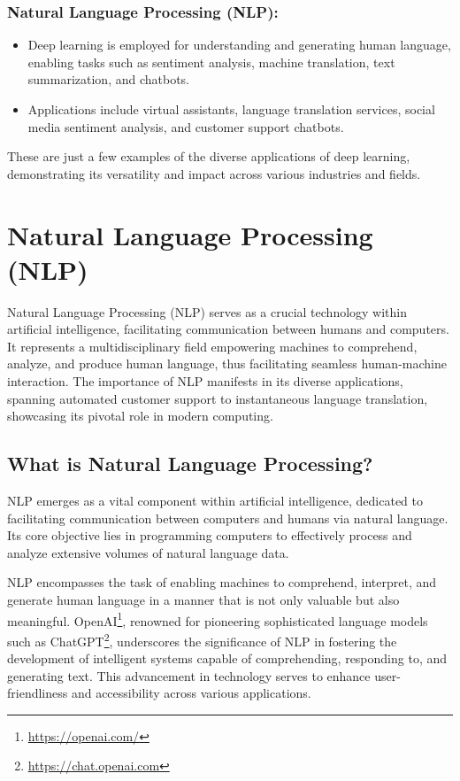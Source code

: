 \subsubsection*{Natural Language Processing (NLP):}

\begin{itemize}
    \item Deep learning is employed for understanding and generating human language, enabling tasks such as sentiment analysis, machine translation, text summarization, and chatbots.
    \item Applications include virtual assistants, language translation services, social media sentiment analysis, and customer support chatbots.
\end{itemize}


These are just a few examples of the diverse applications of deep learning, demonstrating its versatility and impact across various industries and fields.

\clearpage

\section{Natural Language Processing (NLP)}

Natural Language Processing (NLP) serves as a crucial technology within artificial intelligence, facilitating communication between humans and computers. It represents a multidisciplinary field empowering machines to comprehend, analyze, and produce human language, thus facilitating seamless human-machine interaction. The importance of NLP manifests in its diverse applications, spanning automated customer support to instantaneous language translation, showcasing its pivotal role in modern computing.

\subsection{What is Natural Language Processing?}

NLP emerges as a vital component within artificial intelligence, dedicated to facilitating communication between computers and humans via natural language. Its core objective lies in programming computers to effectively process and analyze extensive volumes of natural language data.

NLP encompasses the task of enabling machines to comprehend, interpret, and generate human language in a manner that is not only valuable but also meaningful. OpenAI\footnote{\url{https://openai.com/}}, renowned for pioneering sophisticated language models such as ChatGPT\footnote{\url{https://chat.openai.com}}, underscores the significance of NLP in fostering the development of intelligent systems capable of comprehending, responding to, and generating text. This advancement in technology serves to enhance user-friendliness and accessibility across various applications.

